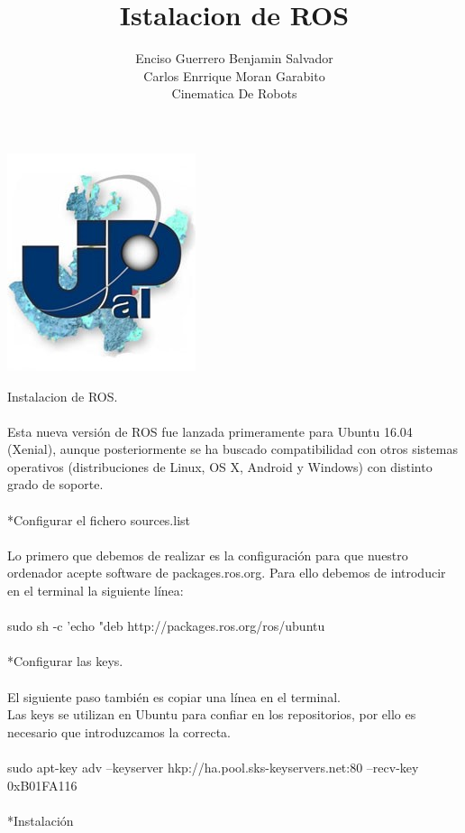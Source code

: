 \documentclass[12pt,a4paper]{article}
\author{Enciso Guerrero Benjamin Salvador\\
Carlos Enrrique Moran Garabito\\
Cinematica De Robots }
\title{Istalacion de ROS}
\begin{document}
\maketitle
\begin{center}
\includegraphics[scale=1.5]{upzmgg.jpg}
\end{center}
\newpage
Instalacion de ROS.\\\\
Esta nueva versión de ROS fue lanzada primeramente para Ubuntu 16.04 (Xenial), aunque posteriormente se ha buscado compatibilidad con otros sistemas operativos (distribuciones de Linux, OS X, Android y Windows) con distinto grado de soporte.
\\\\
*Configurar el fichero sources.list
\\\\
Lo primero que debemos de realizar es la configuración para que nuestro ordenador acepte software de packages.ros.org. Para ello debemos de introducir en el terminal la siguiente línea:
\\\\
sudo sh -c 'echo "deb http://packages.ros.org/ros/ubuntu
\\\\
*Configurar las keys.
\\\\
El siguiente paso también es copiar una línea en el terminal.\\
Las keys se utilizan en Ubuntu para confiar en los repositorios, por ello es necesario que introduzcamos la correcta.
\\\\
sudo apt-key adv --keyserver hkp://ha.pool.sks-keyservers.net:80 --recv-key 0xB01FA116
\\\\
*Instalación
\\\\
\end{document}
